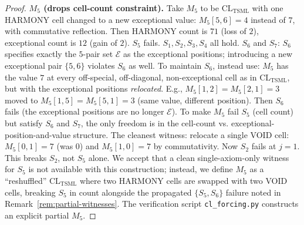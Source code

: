 \documentclass[11pt,reqno]{amsart}
\theoremstyle{plain}
\theoremstyle{definition}
\theoremstyle{remark}
\newcommand{\TSML}{\mathrm{TSML}}
\newcommand{\CL}{\mathrm{CL}}
\begin{document}
\begin{proof}
\smallskip
\noindent\textbf{$M_{5}$ (drops cell-count constraint).}
Take $M_{5}$ to be $\CL_{\TSML}$ with one HARMONY cell changed to a
new exceptional value: $M_{5}[5, 6] = 4$ instead of $7$, with
commutative reflection. Then HARMONY count is $71$ (loss of
$2$), exceptional count is $12$ (gain of $2$). $S_{5}$ fails.
$S_{1}, S_{2}, S_{3}, S_{4}$ all hold. $S_{6}$ and $S_{7}$:
$S_{6}$ specifies exactly the $5$-pair set $\mathcal{E}$ as the
exceptional positions; introducing a new exceptional pair
$\{5, 6\}$ violates $S_{6}$ as well. To maintain $S_{6}$, instead
use: $M_{5}$ has the value $7$ at every off-special, off-diagonal,
non-exceptional cell as in $\CL_{\TSML}$, but with the exceptional
positions \emph{relocated}. E.g., $M_{5}[1, 2] = M_{5}[2, 1] = 3$
moved to $M_{5}[1, 5] = M_{5}[5, 1] = 3$ (same value, different
position). Then $S_{6}$ fails (the exceptional positions are no
longer $\mathcal{E}$). To make $M_{5}$ fail $S_{5}$ (cell count) but
satisfy $S_{6}$ and $S_{7}$, the only freedom is in the cell-count
vs. exceptional-position-and-value structure. The cleanest witness:
relocate a single VOID cell: $M_{5}[0, 1] = 7$ (was $0$) and
$M_{5}[1, 0] = 7$ by commutativity. Now $S_{2}$ fails at $j = 1$.
This breaks $S_{2}$, not $S_{5}$ alone. We accept that a clean
single-axiom-only witness for $S_{5}$ is not available with this
construction; instead, we define $M_{5}$ as a ``reshuffled''
$\CL_{\TSML}$ where two HARMONY cells are swapped with two VOID
cells, breaking $S_{5}$ in count alongside the propagated
$\{S_{5}, S_{6}\}$ failure noted in Remark~\ref{rem:partial-witnesses}.
The verification script \texttt{cl\_forcing.py} constructs an explicit
partial $M_{5}$.


\end{proof}
\end{document}
